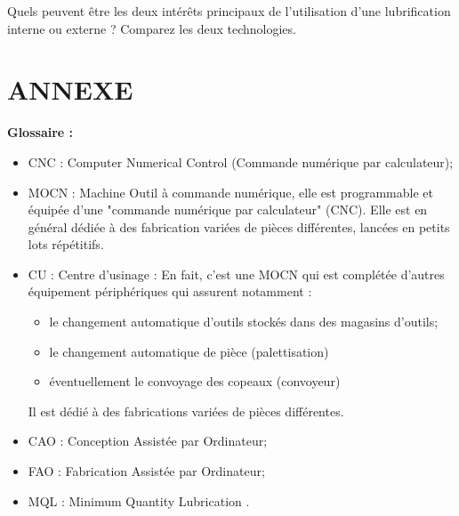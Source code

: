 \documentclass[12pt]{article}
\newcounter{exo}
\newenvironment{exo}{\stepcounter{exo}\vspace{0.5cm}{\bfseries Question \theexo\ :}}{\par\vspace{0.5cm}}
\begin{document}
\begin{exo} Quels peuvent être les deux intérêts principaux de l'utilisation d'une lubrification interne ou externe ? Comparez les deux technologies.\end{exo}







\section{ANNEXE}
\begin{tcolorbox}[colback=blue!5!white,colframe=orange!75!black]
\begin{center}
    \textbf{Glossaire :}
\end{center}
\begin{itemize}
    \item CNC : Computer Numerical Control (Commande numérique par calculateur);
    \item MOCN : Machine Outil à commande numérique, elle est programmable et équipée d'une "commande numérique par calculateur" (CNC). Elle est en général dédiée à des fabrication variées de pièces différentes, lancées en petits lots répétitifs.
    \item CU : Centre d'usinage : En fait, c'est une MOCN qui est complétée d'autres équipement périphériques qui assurent notamment : \begin{itemize}
        \item le changement automatique d'outils stockés dans des magasins d'outils;
        \item le changement automatique de pièce (palettisation)
        \item éventuellement le convoyage des copeaux (convoyeur)
    \end{itemize}
    Il est dédié à des fabrications variées de pièces différentes.
    \item CAO : Conception Assistée par Ordinateur;
    \item FAO : Fabrication Assistée par Ordinateur;
    \item MQL : Minimum Quantity Lubrication .
\end{itemize}
\end{tcolorbox}
\end{document}
